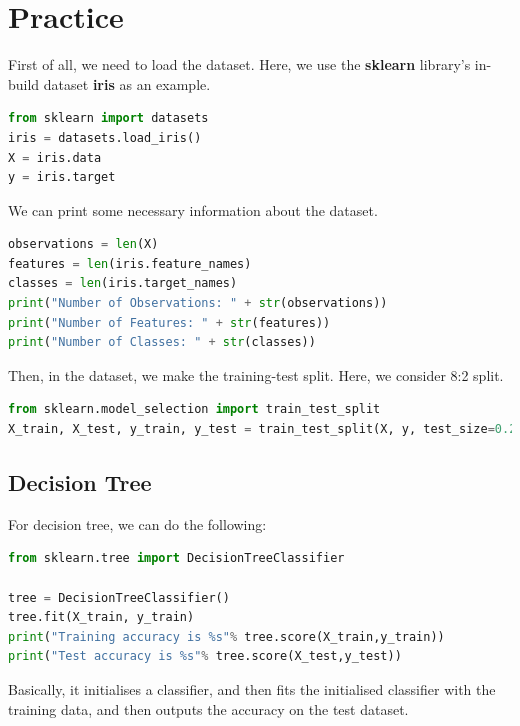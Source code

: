 \fi

\newpage
\section{Practice}

First of all, we need to load the dataset. Here, we use the \textbf{sklearn} library's in-build dataset \textbf{iris} as an example.  

\begin{lstlisting}[language=Python]
from sklearn import datasets
iris = datasets.load_iris()
X = iris.data
y = iris.target
\end{lstlisting}

We can print some necessary information about the dataset. 

\begin{lstlisting}[language=Python]
observations = len(X)
features = len(iris.feature_names)
classes = len(iris.target_names)
print("Number of Observations: " + str(observations))
print("Number of Features: " + str(features))
print("Number of Classes: " + str(classes))
\end{lstlisting}

Then, in the dataset, we make the training-test split. Here, we consider 8:2 split. 

\begin{lstlisting}[language=Python]
from sklearn.model_selection import train_test_split
X_train, X_test, y_train, y_test = train_test_split(X, y, test_size=0.20)

\end{lstlisting}

\subsection*{Decision Tree} 

For decision tree, we can do the following: 

\begin{lstlisting}[language=Python]
from sklearn.tree import DecisionTreeClassifier

tree = DecisionTreeClassifier()
tree.fit(X_train, y_train)
print("Training accuracy is %s"% tree.score(X_train,y_train))
print("Test accuracy is %s"% tree.score(X_test,y_test))
\end{lstlisting}
Basically, it initialises a classifier, and then fits the initialised classifier with the training data, and then outputs the accuracy on the test dataset. 

